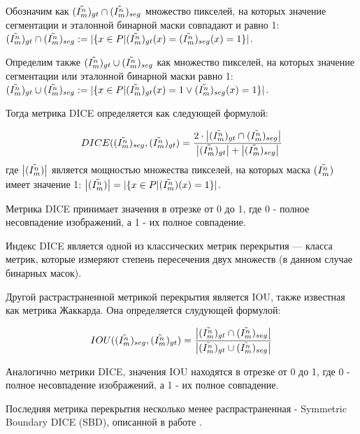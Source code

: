 Обозначим как \((\tilde{I^n_m})_{gt} \cap (\tilde{I^n_m})_{seg}\) множество пикселей, на которых значение сегментации и эталонной бинарной маски совпадают и равно 1: \((\tilde{I^n_m})_{gt} \cap (\tilde{I^n_m})_{seg} := |\{x \in P | (\tilde{I^n_m})_{gt}(x) = (\tilde{I^n_m})_{seg}(x) = 1 \}|\).

Определим также \((\tilde{I^n_m})_{gt} \cup (\tilde{I^n_m})_{seg}\) как множество пикселей, на которых значение сегментации или эталонной бинарной маски  равно 1: \((\tilde{I^n_m})_{gt} \cup (\tilde{I^n_m})_{seg} := |\{x \in P | (\tilde{I^n_m})_{gt}(x) = 1 \lor (\tilde{I^n_m})_{seg}(x) = 1 \}|\).

Тогда метрика DICE определяется как следующей формулой:

\begin{equation}\label{eq:DICE}
    DICE((\tilde{I^n_m})_{seg}, (\tilde{I^n_m})_{gt}) =
    \frac{2 \cdot \left|(\tilde{I^n_m})_{gt} \cap (\tilde{I^n_m})_{seg}\right|}
         {\left|(\tilde{I^n_m})_{gt}\right| + \left|(\tilde{I^n_m})_{seg}\right|}
\end{equation}
где \(\left|(\tilde{I^n_m})\right|\) является мощностью множества пикселей, на которых  маска \((\tilde{I^n_m})\) имеет значение 1: \(\left|(\tilde{I^n_m})\right| = |\{x \in P | (\tilde{I^n_m})(x) = 1 \}|\).

Метрика DICE принимает значения в отрезке от 0 до 1, где 0 - полное несовпадение изображений, а 1 - их полное совпадение.

Индекс DICE является одной из классических метрик перекрытия — класса метрик, которые измеряют степень пересечения двух множеств (в данном случае бинарных масок). 

Другой растрастраненной метрикой перекрытия является IOU, также известная как метрика Жаккарда. Она определяется слудующей формулой:

\begin{equation}\label{eq:IOU}
    IOU((\tilde{I^n_m})_{seg}, (\tilde{I^n_m})_{gt}) =
    \frac{\left|(\tilde{I^n_m})_{gt} \cap (\tilde{I^n_m})_{seg}\right|}
         {\left|(\tilde{I^n_m})_{gt} \cup (\tilde{I^n_m})_{seg}\right|}
\end{equation}

Аналогично метрики DICE, значения IOU находятся в отрезке от 0 до 1, где 0 - полное несовпадение изображений, а 1 - их полное совпадение.

Последняя метрика перекрытия несколько менее распрастраненная - Symmetric Boundary DICE (SBD), описанной в работе \cite{yeghiazaryan2018family}.

